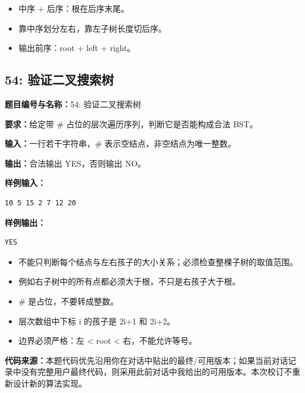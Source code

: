 \documentclass[10pt,a4paper,fontset=none]{ctexart}
\newcommand{\codesource}{\par\noindent\textbf{代码来源：}本题代码优先沿用你在对话中贴出的最终/可用版本；如果当前对话记录中没有完整用户最终代码，则采用此前对话中我给出的可用版本。本次校订不重新设计新的算法实现。\par\vspace{0.2em}}
\begin{document}
\begin{notebox}
\begin{itemize}
  \item 中序 + 后序：根在后序末尾。
  \item 靠中序划分左右，靠左子树长度切后序。
  \item 输出前序：root + left + right。
\end{itemize}
\end{notebox}


\subsection{54: 验证二叉搜索树}
\begin{taskbox}
\textbf{题目编号与名称：}54: 验证二叉搜索树\par
\textbf{要求：}给定带 \# 占位的层次遍历序列，判断它是否能构成合法 BST。\par
\textbf{输入：}一行若干字符串，\# 表示空结点，非空结点为唯一整数。\par
\textbf{输出：}合法输出 YES，否则输出 NO。\par
\textbf{样例输入：}
\begin{lstlisting}[style=sample]
10 5 15 2 7 12 20
\end{lstlisting}
\textbf{样例输出：}
\begin{lstlisting}[style=sample]
YES
\end{lstlisting}
\end{taskbox}
\begin{mistakebox}
\begin{itemize}
  \item 不能只判断每个结点与左右孩子的大小关系；必须检查整棵子树的取值范围。
  \item 例如右子树中的所有点都必须大于根，不只是右孩子大于根。
  \item \# 是占位，不要转成整数。
  \item 层次数组中下标 i 的孩子是 2i+1 和 2i+2。
  \item 边界必须严格：左 < root < 右，不能允许等号。
\end{itemize}
\end{mistakebox}
\codesource
\end{document}
